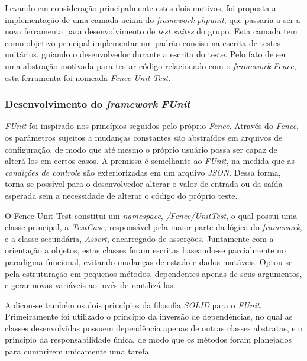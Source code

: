 Levando em consideração principalmente estes dois motivos, foi proposta a implementação de uma camada acima do \emph{framework} \emph{phpunit}, que passaria a ser a nova ferramenta para desenvolvimento de \emph{test suites} do grupo. Esta camada tem como objetivo principal implementar um padrão conciso na escrita de testes unitários, guiando o desenvolvedor durante a escrita do teste. Pelo fato de ser uma abstração motivada para testar código relacionado com o \emph{framework} \emph{Fence}, esta ferramenta foi nomeada \emph{Fence Unit Test}.

\hypertarget{desenvolvimento-do-framework-funit}{%
\subsubsection{\texorpdfstring{Desenvolvimento do \emph{framework} \emph{FUnit}}{Desenvolvimento do framework FUnit}}\label{desenvolvimento-do-framework-funit}}

\emph{FUnit} foi inspirado nos princípios seguidos pelo próprio \emph{Fence}. Através do \emph{Fence}, os parâmetros sujeitos a mudanças constantes são abstraídos em arquivos de configuração, de modo que até mesmo o próprio usuário possa ser capaz de alterá-los em certos casos. A premissa é semelhante ao \emph{FUnit}, na medida que as \emph{condições de controle} são exteriorizadas em um arquivo \emph{JSON}. Dessa forma, torna-se possível para o desenvolvedor alterar o valor de entrada ou da saída esperada sem a necessidade de alterar o código do próprio teste.

O Fence Unit Test constitui um \emph{namespace}, \emph{/Fence/UnitTest}, o qual possui uma classe principal, a \emph{TestCase}, responsável pela maior parte da lógica do \emph{framework}, e a classe secundária, \emph{Assert}, encarregado de asserções. Juntamente com a orientação a objetos, estas classes foram escritas baseando-se parcialmente no paradigma funcional, evitando mudanças de estado e dados mutáveis. Optou-se pela estruturação em pequenos métodos, dependentes apenas de seus argumentos, e gerar novas variáveis ao invés de reutilizá-las.

Aplicou-se também os dois princípios da filosofia \emph{SOLID} para o \emph{FUnit}. Primeiramente foi utilizado o princípio da inversão de dependências, no qual as classes desenvolvidas possuem dependência apenas de outras classes abstratas, e o princípio da responsabilidade única, de modo que os métodos foram planejados para cumprirem unicamente uma tarefa.

